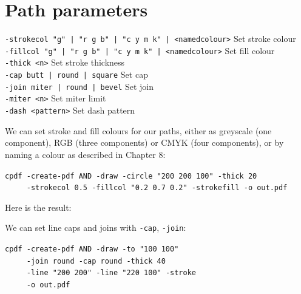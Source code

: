 \documentclass{book}
\begin{document}
\section{Path parameters}
  {\small\begin{framed}
   \noindent\verb!-strokecol "g" | "r g b" | "c y m k" | <namedcolour>! Set stroke colour\\
   \noindent\verb!-fillcol "g" | "r g b" | "c y m k" | <namedcolour>! Set fill colour\\
   \noindent\verb!-thick <n>! Set stroke thickness\\
   \noindent\verb!-cap butt | round | square! Set cap\\
   \noindent\verb!-join miter | round | bevel! Set join\\
   \noindent\verb!-miter <n>! Set miter limit\\
   \noindent\verb!-dash <pattern>! Set dash pattern
  \end{framed}}

We can set stroke and fill colours for our paths, either as greyscale (one component), RGB (three components) or CMYK (four components), or by naming a colour as described in Chapter 8:

\begin{framed}
 \noindent\small\verb?cpdf -create-pdf AND -draw -circle "200 200 100" -thick 20?\\
 \noindent\small\verb?     -strokecol 0.5 -fillcol "0.2 0.7 0.2" -strokefill -o out.pdf?
\end{framed}

\noindent Here is the result:

\bigskip
{}
\bigskip

\noindent We can set line caps and joins with \texttt{-cap}, \texttt{-join}:

\begin{framed}
 \noindent\small\verb?cpdf -create-pdf AND -draw -to "100 100"?\\
 \noindent\small\verb?     -join round -cap round -thick 40?\\
 \noindent\small\verb?     -line "200 200" -line "220 100" -stroke?\\
 \noindent\small\verb?     -o out.pdf?
\end{framed}
\end{document}
